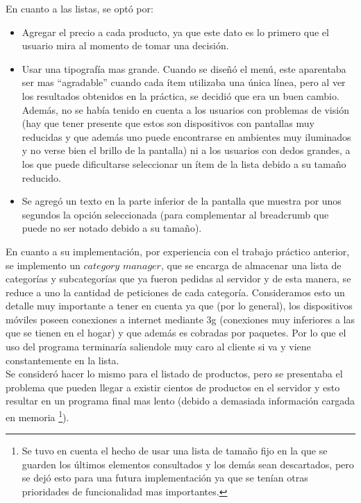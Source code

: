 \documentclass[english]{article}
\begin{document}
En cuanto a las listas, se optó por: 
\begin{itemize}
\item Agregar el precio a cada producto, ya que este dato es lo primero
que el usuario mira al momento de tomar una decisión. 
\item Usar una tipografía mas grande. Cuando se diseñó el menú, este aparentaba
ser mas {}``agradable” cuando cada ítem utilizaba una única línea,
pero al ver los resultados obtenidos en la práctica, se decidió que
era un buen cambio. Además, no se había tenido en cuenta a los usuarios
con problemas de visión (hay que tener presente que estos son dispositivos
con pantallas muy reducidas y que además uno puede encontrarse en
ambientes muy iluminados y no verse bien el brillo de la pantalla)
ni a los usuarios con dedos grandes, a los que puede dificultarse
seleccionar un ítem de la lista debido a su tamaño reducido. 
\item Se agregó un texto en la parte inferior de la pantalla que muestra
por unos segundos la opción seleccionada (para complementar al breadcrumb
que puede no ser notado debido a su tamaño).\\

\end{itemize}
En cuanto a su implementación, por experiencia con el trabajo práctico
anterior, se implemento un \textquotedbl{}$category$ $manager$\textquotedbl{},
que se encarga de almacenar una lista de categorías y subcategorías
que ya fueron pedidas al servidor y de esta manera, se reduce a uno
la cantidad de peticiones de cada categoría. Consideramos esto un
detalle muy importante a tener en cuenta ya que (por lo general),
los dispositivos móviles poseen conexiones a internet mediante 3g
(conexiones muy inferiores a las que se tienen en el hogar) y que
además es cobradas por paquetes. Por lo que el uso del programa terminaría
saliendole muy caro al cliente si va y viene constantemente en la lista.\\
 Se consideró hacer lo mismo para el listado de productos, pero
se presentaba el problema que pueden llegar a existir cientos de productos
en el servidor y esto resultar en un programa final mas lento (debido
a demasiada información cargada en memoria%
\footnote{Se tuvo en cuenta el hecho de usar una lista de tamaño fijo en la
que se guarden los últimos elementos consultados y los demás sean
descartados, pero se dejó esto para una futura implementación ya que
se tenían otras prioridades de funcionalidad mas importantes.%
}).\\
 
\end{document}
